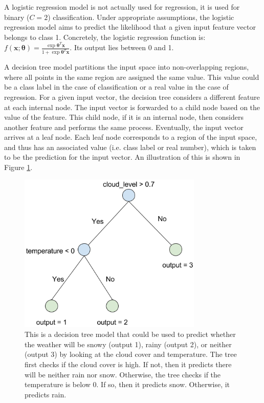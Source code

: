 A logistic regression model is not actually used for regression, it is used for 
binary ($C=2$) classification. Under appropriate assumptions, the logistic 
regression model aims to predict the likelihood that a given input feature vector
belongs to class 1. Concretely, the logistic regression function is: 
$f(\textbf{x}; \boldsymbol{\theta}) = \frac{\exp{\boldsymbol{\theta}^{T}\textbf{x}}}{1 + \exp{\boldsymbol{\theta}^{T}\textbf{x}}}$.
Its output lies between 0 and 1.

A decision tree model partitions the input space into non-overlapping regions, where all
points in the same region are assigned the same value. This value could be a class label
in the case of classification or a real value in the case of regression. For a given input vector,
the decision tree considers a different feature at each internal node. The input vector is forwarded
to a child node based on the value of the feature. This child node, if it is an internal node, then considers another
feature and performs the same process. Eventually, the input vector arrives at a leaf node. Each leaf node corresponds to
a region of the input space, and thus has an associated value (i.e. class label or real number), which is taken
to be the prediction for the input vector. An illustration of this is shown in Figure \ref{fig:sample_decision_tree}.

\begin{figure}
  \centering
  \includegraphics[height=3.0in]{sample_decision_tree}
  \caption{This is a decision tree model that could be used to predict whether the
  weather will be snowy (output 1), rainy (output 2), or neither (output 3) by
  looking at the cloud cover and temperature. The tree first checks if the cloud cover
  is high. If not, then it predicts there will be neither rain nor snow. Otherwise, the
  tree checks if the temperature is below 0. If so, then it predicts snow. Otherwise, it
  predicts rain.}
  \label{fig:sample_decision_tree}
\end{figure}

